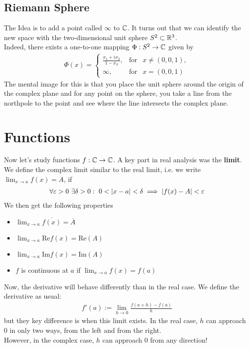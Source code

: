\subsection{Riemann Sphere}
The Idea is to add a point called $\infty$ to $\mathbb{C}$. It turns out that we can identify the new space with the two-dimensional unit sphere $S^2 \subset \mathbb{R}^3$.\\
Indeed, there exists a one-to-one mapping $\Phi: S^2 \to \mathbb{C}$ given by
\begin{align*}
				\Phi(x) = \left\{\begin{array}{rcl}
												\frac{x_1 + i x_2}{1 - x_3}, &\text{for}& x \neq (0,0,1), \\
												\infty, &\text{for} & x = (0,0,1)
				\end{array} \right.	 
\end{align*}
The mental image for this is that you place the unit sphere around the origin of the complex plane and for any point on the sphere, you take a line from the northpole to the point and see where the line intersects the complex plane.\\





\section{Functions}
Now let's study functions $f: \mathbb{C} \to \mathbb{C}$. A key part in real analysis was the \textbf{limit}. We define the complex limit similar to the real limit, i.e. we write $\lim_{x \to a}f(x) = A$, if
\begin{align*}
				\forall \varepsilon > 0\ \exists \delta > 0:\ 0 < \vert x-a\vert < \delta \implies \vert f(x) - A\vert < \varepsilon
\end{align*}
We then get the following properties
\begin{itemize}
\item $\lim_{x \to a} \overline{f(x)} = \overline{A}$
\item $\lim_{x \to a} \text{Re} f(x) = \text{Re}(A)$
\item $\lim_{x \to a} \text{Im}f(x) = \text{Im}(A)$
\item $f$ is continuous at $a$ if $\lim_{x \to a} f(x) = f(a)$
\end{itemize}

Now, the derivative will behave differently than in the real case. We define the derivative as usual:
\begin{align*}
				f'(a) := \lim_{h \to 0} \frac{f(a+h) - f(a)}{h}
\end{align*}
but they key difference is when this limit exists. In the real case, $h$ can approach $0$ in only two ways, from the left and from the right.\\
However, in the complex case, $h$ can approach $0$ from any direction!\\

